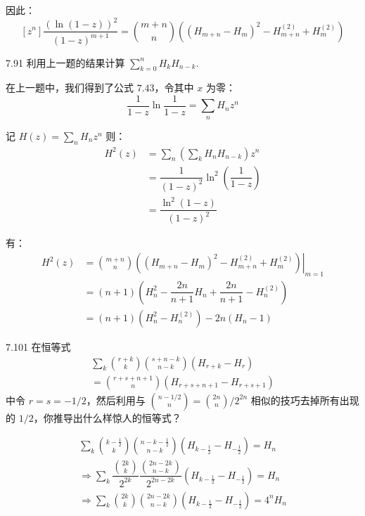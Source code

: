 因此：
\[
  [z^n] \dfrac{(\ln{(1-z)})^2}{(1-z)^{m+1}} = \binom{m+n}{n} ((H_{m+n} - H_m)^2 - H_{m+n}^{(2)} + H_m^{(2)})
\]

\begin{problem}{7.9}{1}
  利用上一题的结果计算 \( \sum_{k=0}^n H_k H_{n-k} \).
\end{problem}

在上一题中，我们得到了公式 \( 7.43 \)，令其中 \( x \) 为零：
\[
  \boxed{\dfrac{1}{1-z} \ln{\dfrac{1}{1-z}} = \sum_n H_n z^n}
\]

记 \( H(z) = \sum_n H_n z^n \) 则：
\begin{align*}
  H^2(z) &= \sum_n (\sum_k H_n H_{n-k}) z^n \\
  &= \dfrac{1}{(1-z)^2} \ln^2{(\dfrac{1}{1-z})} \\
  &= \dfrac{\ln^2{(1-z)}}{(1-z)^2}
\end{align*}

有：
\begin{align*}
  [z^n] H^2(z)
  &= \left. \binom{m+n}{n} ((H_{m+n} - H_m)^2 - H_{m+n}^{(2)} + H_m^{(2)}) \right|_{m=1} \\
  &= (n+1) \left( H_n^2 - \dfrac{2n}{n+1} H_n + \dfrac{2n}{n+1} - H_n^{(2)} \right) \\
  &= (n+1)( H_n^2 -  H_n^{(2)} ) - 2n (H_n - 1)
\end{align*}

\begin{problem}{7.10}{1}
  在恒等式
  \begin{gather*}
    \sum_k \binom{r+k}{k} \binom{s+n-k}{n-k} (H_{r+k} - H_r) \\
    = \binom{r+s+n+1}{n} (H_{r+s+n+1} - H_{r+s+1})
  \end{gather*}
  中令 \( r = s = -1 / 2 \)，然后利用与 \( \displaystyle \binom{n-1/2}{n} = \binom{2n}{n} \Big/ 2^{2n} \) 相似的技巧去掉所有出现的 \( 1 / 2 \)，你推导出什么样惊人的恒等式？
\end{problem}

\begin{gather*}
  \sum_k \binom{k - \frac{1}{2}}{k} \binom{n-k - \frac{1}{2}}{n-k} (H_{k-\frac{1}{2}} - H_{-\frac{1}{2}}) = H_n \\
  \Rightarrow \sum_k \dfrac{\binom{2k}{k}}{2^{2k}} \dfrac{\binom{2n-2k}{n-k}}{2^{2n-2k}} (H_{k-\frac{1}{2}} - H_{-\frac{1}{2}})= H_n \\
  \Rightarrow \sum_k \binom{2k}{k} \binom{2n-2k}{n-k} (H_{k-\frac{1}{2}} - H_{-\frac{1}{2}}) = 4^n H_n
\end{gather*}

